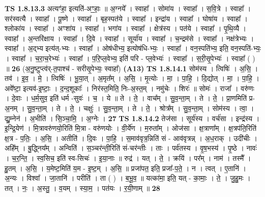 \documentclass[17pt]{extarticle}
\begin{document}
                  \newline
                                \textbf{ TS 1.8.13.3} \newline
                  अत्यꣳ॑हा॒ इत्यति॑-अꣳ॒॒हाः॒ ॥ अ॒ग्नये᳚ । स्वाहा᳚ । सोमा॑य । स्वाहा᳚ । स॒वि॒त्रे । स्वाहा᳚ । सर॑स्वत्यै । स्वाहा᳚ । पू॒ष्णे । स्वाहा᳚ । बृह॒स्पत॑ये । स्वाहा᳚ । इन्द्रा॑य । स्वाहा᳚ । घोषा॑य । स्वाहा᳚ । श्लोका॑य । स्वाहा᳚ । अꣳशा॑य । स्वाहा᳚ । भगा॑य । स्वाहा᳚ । क्षेत्र॑स्य । पत॑ये । स्वाहा᳚ । पृ॒थि॒व्यै । स्वाहा᳚ । अ॒न्तरि॑क्षाय । स्वाहा᳚ । दि॒वे । स्वाहा᳚ । सूर्या॑य । स्वाहा᳚ । च॒न्द्रम॑से । स्वाहा᳚ । नक्ष॑त्रेभ्यः । स्वाहा᳚ । अ॒द्भ्य इत्य॑त्-भ्यः । स्वाहा᳚ । ओष॑धीभ्य॒ इत्योष॑धि-भ्यः॒ । स्वाहा᳚ । वन॒स्पति॑भ्य॒ इति॒ वन॒स्पति॑-भ्यः॒ । स्वाहा᳚ । च॒रा॒च॒रेभ्यः॑ । स्वाहा᳚ । प॒रि॒प्ल॒वेभ्य॒ इति॑ परि - प्ल॒वेभ्यः॑ । स्वाहा᳚ । स॒री॒सृ॒पेभ्यः॑ । स्वाहा᳚ ( ) ॥ \textbf{  26} \newline
                  \newline
                      (अ॒नु॒ष्टुप्त्व॑र्-त॒पाश्च॑ - सरीसृ॒पेभ्यः॒ स्वाहा᳚)  \textbf{(A13)} \newline \newline
                                \textbf{ TS 1.8.14.1} \newline
                  सोम॑स्य । त्विषिः॑ । अ॒सि॒ । तव॑ । इ॒व॒ । मे॒ । त्विषिः॑ । भू॒या॒त् । अ॒मृत᳚म् । अ॒सि॒ । मृ॒त्योः । मा॒ । पा॒हि॒ । दि॒द्योत् । मा॒ । पा॒हि॒ । अवे᳚ष्टा॒ इत्यव॑-इ॒ष्टाः॒ । द॒न्द॒शूकाः᳚ । निर॑स्त॒मिति॒ निः-अ॒स्त॒म् । नमु॑चेः । शिरः॑ ॥ सोमः॑ । राजा᳚ । वरु॑णः । दे॒वाः । ध॒र्म॒सुव॒ इति॑ धर्म -सुवः॑ । च॒ । ये ॥ ते । ते॒ । वाच᳚म् । सु॒व॒न्ता॒म् । ते । ते॒ । प्रा॒णमिति॑ प्र-अ॒नम् । सु॒व॒न्ता॒म् । ते । ते॒ । चक्षुः॑ । सु॒व॒न्ता॒म् । ते । ते॒ । श्रोत्र᳚म् । सु॒व॒न्ता॒म् । सोम॑स्य । त्वा॒ । द्यु॒म्नेन॑ । अ॒भीति॑ । सि॒ञ्चा॒मि॒ । अ॒ग्नेः । \textbf{  27} \newline
                  \newline
                                \textbf{ TS 1.8.14.2} \newline
                  तेज॑सा । सूर्य॑स्य । वर्च॑सा । इन्द्र॑स्य । इ॒न्द्रि॒येण॑ । मि॒त्रावरु॑णयो॒रिति॑ मि॒त्रा - वरु॑णयोः । वी॒र्ये॑ण । म॒रुता᳚म् । ओज॑सा । क्ष॒त्राणा᳚म् । क्ष॒त्रप॑ति॒रिति॑ क्ष॒त्र - प॒तिः॒ । अ॒सि॒ । अतीति॑ । दि॒वः । पा॒हि॒ । स॒माव॑वृत्र॒न्निति॑ सं - आव॑वृत्रन्न् । अ॒ध॒राक् । उदी॑चीः । अहि᳚म् । बु॒द्ध्निय᳚म् । अन्विति॑॑ । स॒ञ्चर॑न्ती॒रिति॑ सं-चर॑न्तीः । ताः । पर्व॑तस्य । वृ॒ष॒भस्य॑ । पृ॒ष्ठे । नावः॑ । च॒र॒न्ति॒ । स्व॒सिच॒ इति॑ स्व-सिचः॑ । इ॒या॒नाः ॥ रुद्र॑ । यत् । ते॒ । क्रयि॑ । पर᳚म् । नाम॑ । तस्मै᳚ । हु॒तम् । अ॒सि॒ । य॒मेष्ट॒मिति॑ य॒म - इ॒ष्ट॒म् । अ॒सि॒ ॥ प्रजा॑पत॒ इति॒ प्रजा᳚-प॒ते॒ । न । त्वत् । ए॒तानि॑ । अ॒न्यः । विश्वा᳚ । जा॒तानि॑ । परीति॑ । ता ( ) । ब॒भू॒व॒ ॥ यत्का॑मा॒ इति॒ यत् - का॒माः॒ । ते॒ । जु॒हु॒मः । तत् । नः॒ । अ॒स्तु॒ । व॒यम् । स्या॒म॒ । पत॑यः । र॒यी॒णाम् ॥ \textbf{  28 } \newline
\end{document}
